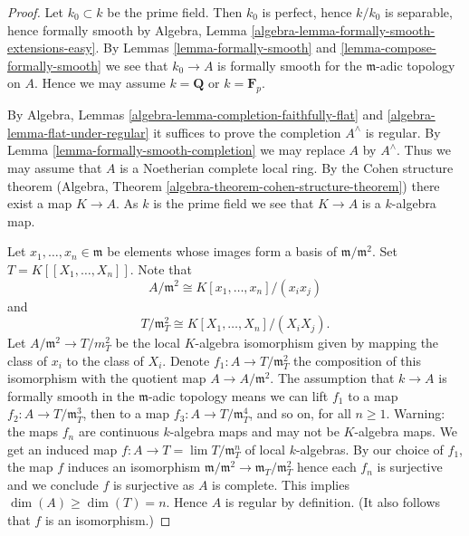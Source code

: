 \documentclass[10pt,a4paper]{amsart}
\theoremstyle{plain}
\theoremstyle{definition}
\theoremstyle{remark}
\numberwithin{equation}{subsection}
\def\lim{\mathop{\mathrm{lim}}\nolimits}
\begin{document}
\begin{proof}
Let $k_0 \subset k$ be the prime field. Then $k_0$ is perfect, hence
$k / k_0$ is separable, hence formally smooth by
Algebra, Lemma \ref{algebra-lemma-formally-smooth-extensions-easy}. By
Lemmas \ref{lemma-formally-smooth} and \ref{lemma-compose-formally-smooth}
we see that $k_0 \to A$ is formally smooth for the $\mathfrak m$-adic
topology on $A$. Hence we may assume $k = \mathbf{Q}$ or $k = \mathbf{F}_p$.

\medskip\noindent
By Algebra, Lemmas \ref{algebra-lemma-completion-faithfully-flat} and
\ref{algebra-lemma-flat-under-regular} it
suffices to prove the completion $A^\wedge$ is regular.
By Lemma \ref{lemma-formally-smooth-completion} we may replace
$A$ by $A^\wedge$. Thus we may assume that $A$ is a Noetherian
complete local ring. By the Cohen structure theorem
(Algebra, Theorem \ref{algebra-theorem-cohen-structure-theorem})
there exist a map $K \to A$. As $k$ is the prime field we see that
$K \to A$ is a $k$-algebra map.

\medskip\noindent
Let $x_1, \ldots, x_n \in \mathfrak m$ be elements whose images
form a basis of $\mathfrak m/\mathfrak m^2$.
Set $T = K[[X_1, \ldots, X_n]]$. Note that
$$
A/\mathfrak m^2 \cong K[x_1, \ldots, x_n]/(x_ix_j)
$$
and
$$
T/\mathfrak m_T^2 \cong K[X_1, \ldots, X_n]/(X_iX_j).
$$
Let $A/\mathfrak m^2 \to T/m_T^2$ be the local $K$-algebra isomorphism
given by mapping the class of $x_i$ to the class of $X_i$.
Denote $f_1 : A \to T/\mathfrak m_T^2$ the composition of this
isomorphism with the quotient map $A \to A/\mathfrak m^2$.
The assumption that $k \to A$ is formally smooth in the $\mathfrak m$-adic
topology means we can lift $f_1$ to a map
$f_2 : A \to T/\mathfrak{m}_T^3$, then to a map
$f_3 : A \to T/\mathfrak{m}_T^4$, and so on, for all $n \geq 1$.
Warning: the maps $f_n$ are continuous $k$-algebra maps and may not
be $K$-algebra maps. We get an induced map
$f : A \to T = \lim T/\mathfrak m_T^n$ of local $k$-algebras.
By our choice of $f_1$, the map $f$ induces an
isomorphism $\mathfrak m/\mathfrak m^2 \to \mathfrak m_T/\mathfrak m_T^2$
hence each $f_n$ is surjective and we conclude $f$ is surjective as $A$ is
complete. This implies $\dim(A) \geq \dim(T) = n$. Hence $A$ is regular
by definition. (It also follows that $f$ is an isomorphism.)
\end{proof}
\end{document}
